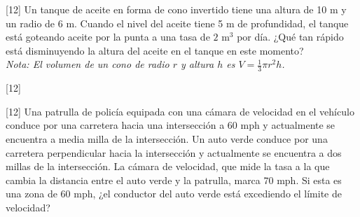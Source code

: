 \documentclass[11pt,paper=a4,answers, addpoints]{exam}
\begin{document}
\begin{questions}

[12\half]
Un tanque de aceite en forma de cono invertido tiene una altura de 10 m y un radio de 6 m. Cuando el nivel del aceite tiene 5 m de profundidad, el tanque está goteando aceite por la punta a una tasa de $2\text{ m}^3$ por día. ¿Qué tan rápido está disminuyendo la altura del aceite en el tanque en este momento? \\
\textit{Nota: El volumen de un cono de radio $r$ y altura $h$ es $V = \frac{1}{3}\pi r^2 h$.}

[12\half]

[12\half]
Una patrulla de policía equipada con una cámara de velocidad en el vehículo conduce por una carretera hacia una intersección a 60 mph y actualmente se encuentra a media milla de la intersección. Un auto verde conduce por una carretera perpendicular hacia la intersección y actualmente se encuentra a dos millas de la intersección. La cámara de velocidad, que mide la tasa a la que cambia la distancia entre el auto verde y la patrulla, marca 70 mph. Si esta es una zona de 60 mph, ¿el conductor del auto verde está excediendo el límite de velocidad?


\end{questions}
\end{document}
